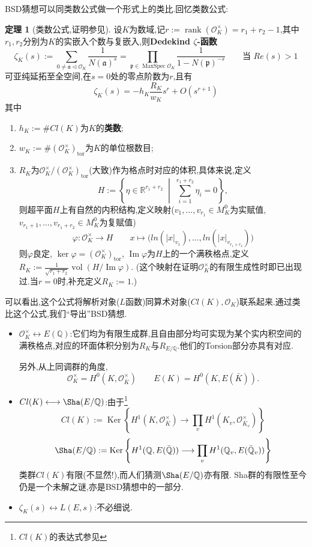 \documentclass[12pt,A4paper,oneside,reqno]{amsart}
\numberwithin{equation}{section}
\theoremstyle{definition}
\newtheorem{theorem}{定理}[section]
\theoremstyle{plain}
\theoremstyle{plain}
\numberwithin{equation}{section}
\theoremstyle{remark}
\DeclareMathOperator{\vol}{vol}
\DeclareMathOperator{\rank}{\operatorname{rank}}
\DeclareMathOperator{\Ker}{\operatorname{Ker}}
\DeclareMathOperator{\Img}{\operatorname{Im}}
\DeclareMathOperator{\tor}{\operatorname{tor}}
\newcommand{\MaxSpec}{\operatorname{MaxSpec}}
\begin{document}
BSD猜想可以同类数公式做一个形式上的类比.回忆类数公式:
\begin{theorem}[类数公式,证明参见{\cite[p217, 定理7.10]{fermat2013dream}}]
	设$K$为数域,记$r:=\rank (\mathcal{O}_K^{\times})=r_1+r_2-1$,其中$r_1,r_2$分别为$K$的实嵌入个数与复嵌入,则\textbf{Dedekind $\zeta$-函数}
	$$\zeta_K(s):=\sum_{0 \neq \mathfrak{a} \vartriangleleft \mathcal{O}_K}\frac{1}{N(\mathfrak{a})^{s}}=\prod_{\mathfrak{p} \in \MaxSpec \mathcal{O}_K} \frac{1}{1-N(\mathfrak{p})^{-s}} \qquad \text{当 }Re(s)>1 $$
	可亚纯延拓至全空间,在$s=0$处的零点阶数为$r$,且有
	$$\zeta_K(s)=-h_K\frac{R_K}{w_K}s^r+O(s^{r+1})$$
	其中
	\begin{enumerate}
		\item $h_K:=\#Cl(K)$为$K$的\textbf{类数};
		\item $w_K:=\#(\mathcal{O}_K^{\times})_{\tor}$为$K$的单位根数目;
		\item $R_K$为$\mathcal{O}_K^{\times}/(\mathcal{O}_K^{\times})_{\tor}$(大致)作为格点时对应的体积,具体来说,定义
		$$H:=\left\{\eta \in \mathbb{R}^{r_1+r_2} \;\middle|\; \sum_{i=1}^{r_1+r_2}\eta_i=0 \right\}, $$
		则超平面$H$上有自然的内积结构,定义映射($v_1,\ldots,v_{r_1} \in M_K^0$为实赋值, $v_{r_1+1},\ldots ,v_{r_1+r_2} \in M_K^0$为复赋值)
		$$\varphi:\mathcal{O}_K^{\times} \longrightarrow H \qquad x \longmapsto \big(ln(|x|_{v_1}), \ldots, ln(|x|_{v_{r_1+r_2}})\big)$$
		则$\varphi$良定, $\ker \varphi =(\mathcal{O}_K^{\times})_{\tor}$, $\Img \varphi$为$H$上的一个满秩格点,定义$R_K:=\frac{1}{\sqrt{r_1+r_2}}\vol(H/\Img \varphi)$. (这个映射在证明$\mathcal{O}_K^{\times}$的有限生成性时即已出现过.当$r=0$时,补充定义$R_K:=1$.)
	\end{enumerate}
\end{theorem}
可以看出,这个公式将解析对象($L$函数)同算术对象($Cl(K),\mathcal{O}_K$)联系起来.通过类比这个公式,我们“导出”BSD猜想.
\begin{itemize}
	\item $\mathcal{O}_K^{\times} \longleftrightarrow E(\mathbb{Q})$:它们均为有限生成群,且自由部分均可实现为某个实内积空间的满秩格点,对应的环面体积分别为$R_K$与$R_{E/\mathbb{Q}}$.他们的Torsion部分亦具有对应.
	
	另外,从上同调群的角度,
	$$\mathcal{O}_K^{\times}=H^0(K,\mathcal{O}_{\bar{K}}^{\times}) \qquad E(K)=H^0(K,E(\bar{K})).$$
	\item $Cl(K) \longleftrightarrow \Sha (E/\mathbb{Q})$:由于\footnote{$Cl(K)$的表达式参见\cite[Proposition 6]{kb2012classgroup}}
	$$Cl(K):=\Ker \left\{H^1(K,\mathcal{O}_{\bar{K}}^{\times}) \longrightarrow \prod_{v}H^1(K_v,\mathcal{O}_{\bar{K}_v}^{\times}) \right\}$$
	$$\Sha(E/\mathbb{Q}):=\Ker \left\{H^1(\mathbb{Q},E(\bar{\mathbb{Q}})) \longrightarrow \prod_{v}H^1(\mathbb{Q}_v,E(\bar{\mathbb{Q}}_v)) \right\}$$
	类群$Cl(K)$有限(不显然!),而人们猜测$\Sha (E/\mathbb{Q})$亦有限. Sha群的有限性至今仍是一个未解之谜,亦是BSD猜想中的一部分.
	\item $\zeta_K(s) \longleftrightarrow L(E,s)$:不必细说.
\end{itemize}
\end{document}
